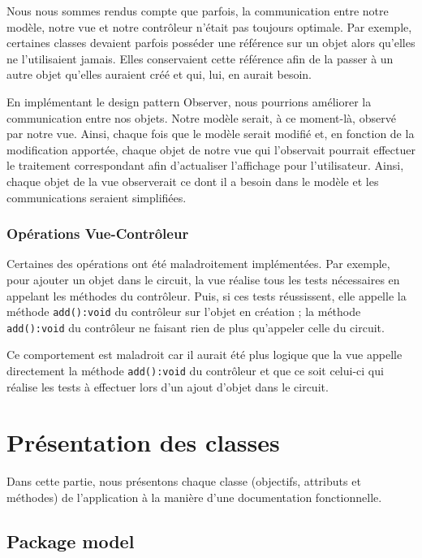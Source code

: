 \documentclass{report}
\begin{document}
Nous nous sommes rendus compte que parfois, la communication entre notre modèle, notre vue et notre contrôleur n'était pas toujours optimale. Par exemple, certaines classes devaient parfois posséder une référence sur un objet alors qu'elles ne l'utilisaient jamais. Elles conservaient cette référence afin de la passer à un autre objet qu'elles auraient créé et qui, lui, en aurait besoin.

En implémentant le design pattern Observer, nous pourrions améliorer la communication entre nos objets. Notre modèle serait, à ce moment-là, observé par notre vue. Ainsi, chaque fois que le modèle serait modifié et, en fonction de la modification apportée, chaque objet de notre vue qui l'observait pourrait effectuer le traitement correspondant afin d'actualiser l'affichage pour l'utilisateur. Ainsi, chaque objet de la vue observerait ce dont il a besoin dans le modèle et les communications seraient simplifiées.

\subsubsection{Opérations Vue-Contrôleur}

Certaines des opérations ont été maladroitement implémentées. Par exemple, pour ajouter un objet dans le circuit, la vue réalise tous les tests nécessaires en appelant les méthodes du contrôleur. Puis, si ces tests réussissent, elle appelle la méthode \texttt{add():void} du contrôleur sur l'objet en création ; la méthode \texttt{add():void} du contrôleur ne faisant rien de plus qu'appeler celle du circuit.

Ce comportement est maladroit car il aurait été plus logique que la vue appelle directement la méthode \texttt{add():void} du contrôleur et que ce soit celui-ci qui réalise les tests à effectuer lors d'un ajout d'objet dans le circuit.

\section{Présentation des classes}

Dans cette partie, nous présentons chaque classe (objectifs, attributs et méthodes) de l'application à la manière d'une documentation fonctionnelle.

\subsection{Package model}
\end{document}
